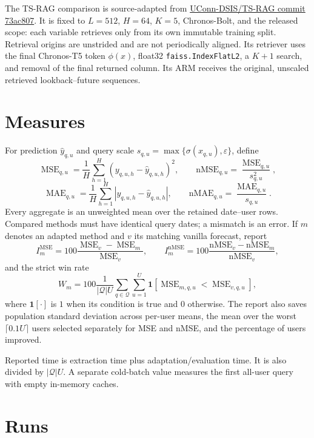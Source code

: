 \documentclass[11pt]{article}
\newcommand{\eps}{\varepsilon}
\newcommand{\code}[1]{\texttt{\detokenize{#1}}}
\DeclareMathOperator{\MSE}{MSE}
\DeclareMathOperator{\MAE}{MAE}
\begin{document}
The TS-RAG comparison is source-adapted from
\href{https://github.com/UConn-DSIS/TS-RAG/tree/73ac807789d2e61b8a3dfc8514e3fc947fe185cc}
{UConn-DSIS/TS-RAG commit 73ac807}. It is fixed to $L=512$, $H=64$, $K=5$,
Chronos-Bolt, and the released \code{only\_self\_train} scope: each variable
retrieves only from its own immutable training split. Retrieval origins are
unstrided and are not periodically aligned. Its retriever uses the final Chronos-T5
token $\phi(x)$, float32 \texttt{faiss.IndexFlatL2}, a $K+1$ search, and removal
of the final returned column. Its ARM receives the original, unscaled retrieved
lookback--future sequences.

\section{Measures}

For prediction $\widehat y_{q,u}$ and query scale
$s_{q,u}=\max\{\sigma(x_{q,u}),\eps\}$, define
\[
 \MSE_{q,u}=\frac1H\sum_{h=1}^H
 (y_{q,u,h}-\widehat y_{q,u,h})^2,
 \qquad
 \mathrm{nMSE}_{q,u}=\frac{\MSE_{q,u}}{s_{q,u}^2},            \tag{18}
\]
\[
 \MAE_{q,u}=\frac1H\sum_{h=1}^H
 |y_{q,u,h}-\widehat y_{q,u,h}|,
 \qquad
 \mathrm{nMAE}_{q,u}=\frac{\MAE_{q,u}}{s_{q,u}}.             \tag{19}
\]
Every aggregate is an unweighted mean over the retained date--user rows.
Compared methods must have identical query dates; a mismatch is an error. If $m$ denotes an
adapted method and $v$ its matching vanilla forecast, report
\[
 I^{\MSE}_m=100\frac{\MSE_v-\MSE_m}{\MSE_v},\qquad
 I^{\mathrm{nMSE}}_m=100\frac{\mathrm{nMSE}_v-\mathrm{nMSE}_m}
 {\mathrm{nMSE}_v},                                          \tag{20}
\]
and the strict win rate
\[
 W_m=100\frac1{|\mathcal Q|U}
 \sum_{q\in\mathcal Q}\sum_{u=1}^U
 \mathbf 1[\MSE_{m,q,u}<\MSE_{v,q,u}],                       \tag{21}
\]
where $\mathbf 1[\cdot]$ is $1$ when its condition is true and $0$ otherwise.
The report also saves population standard deviation across per-user means,
the mean over the worst $\lceil0.1U\rceil$ users selected separately for MSE
and nMSE, and the percentage of users improved.

Reported time is extraction time plus adaptation/evaluation time. It is also
divided by $|\mathcal Q|U$. A separate cold-batch value measures the first
all-user query with empty in-memory caches.

\section{Runs}
\end{document}
